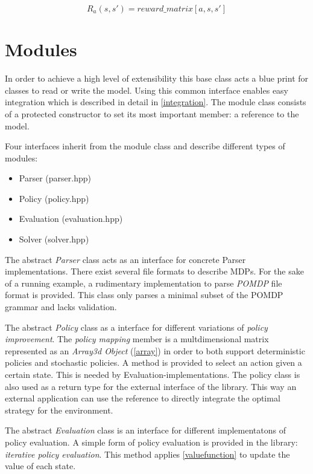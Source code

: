 \begin{equation}
R_a(s,s') = reward\_matrix[a,s,s']
\end{equation}



\section{Modules}
\label{chaptermodule}

In order to achieve a high level of extensibility this  base class acts a blue print for classes to read or write the model. Using this common interface enables easy integration which is described in detail in \autoref{integration}. The module class consists of a protected constructor to set its most important member: a reference to the model. 

Four interfaces inherit from the module class and describe different types of modules:

\begin{itemize}
	\item Parser (parser.hpp)
	\item Policy (policy.hpp)
	\item Evaluation (evaluation.hpp)
	\item Solver (solver.hpp)
\end{itemize}

The abstract \emph{Parser} class acts as an interface for concrete Parser implementations. There exist several file formats to describe MDPs. For the sake of a running example, a rudimentary implementation to parse \emph{POMDP} file format \autocite{Cassandra} is provided. This class only parses a minimal subset of the POMDP grammar and lacks validation. 

The abstract \emph{Policy} class as a interface for different variations of \emph{policy improvement}. The \emph{policy mapping} member is a multdimensional matrix represented as an \emph{Array3d Object} (\autoref{array}) in order to both support deterministic policies and stochastic policies. A method is provided to select an action given a certain state. This is needed by Evaluation-implementations. The policy class is also used as a return type for the external interface of the library. This way an external application can use the reference to directly integrate the optimal strategy for the environment. 

The abstract \emph{Evaluation} class is an interface for different implementatons of policy evaluation. A simple form of policy evaluation is provided in the library: \emph{iterative policy evaluation}. This method applies \autoref{valuefunction} to update the value of each state. 

